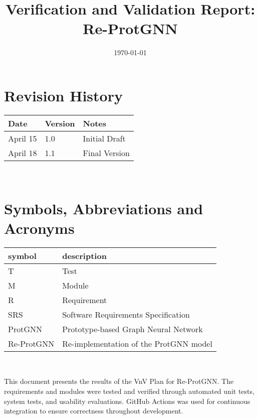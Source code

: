 \documentclass[12pt, titlepage]{article}
\begin{document}
\title{Verification and Validation Report: Re-ProtGNN} 
\author{\authname}
\date{\today}
	
\maketitle


\section{Revision History}

\begin{tabularx}{\textwidth}{p{3cm}p{2cm}X}
\toprule {\bf Date} & {\bf Version} & {\bf Notes}\\
\midrule
April 15 & 1.0 & Initial Draft\\
April 18 & 1.1 & Final Version\\
\bottomrule
\end{tabularx}

~\newpage

\section{Symbols, Abbreviations and Acronyms}

\renewcommand{\arraystretch}{1.2}
\begin{tabular}{l l} 
  \toprule		
  \textbf{symbol} & \textbf{description}\\
  \midrule 
  T & Test\\
  M & Module\\
  R & Requirement\\
  SRS & Software Requirements Specification\\
  ProtGNN & Prototype-based Graph Neural Network\\
  Re-ProtGNN & Re-implementation of the ProtGNN model\\
  \bottomrule
\end{tabular}\\


\newpage

\tableofcontents

\listoftables %


\newpage


This document presents the results of the VnV Plan \citep{Yuanqi_ReProtGNN_VnV} for Re-ProtGNN. The requirements and modules were tested and verified through automated unit tests, system tests, and usability evaluations. GitHub Actions was used for continuous integration to ensure correctness throughout development.
\end{document}

